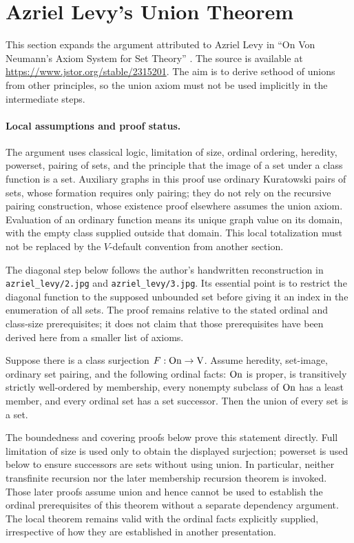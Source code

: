 \def\topic{Mechanization of Azriel Levy's Proof}

\section{Azriel Levy's Union Theorem}
This section expands the argument attributed to Azriel Levy in
``On Von Neumann's Axiom System for Set Theory'' \cite{Levy68}.
The source is available at \url{https://www.jstor.org/stable/2315201}.
The aim is to derive sethood of unions from other principles, so the union
axiom must not be used implicitly in the intermediate steps.

\paragraph{Local assumptions and proof status.}
The argument uses classical logic, limitation of size, ordinal ordering,
heredity, powerset, pairing of sets, and the principle that the image of a
set under a class function is a set. Auxiliary graphs in this proof use
ordinary Kuratowski pairs of sets, whose formation requires only pairing;
they do not rely on the recursive pairing construction, whose existence
proof elsewhere assumes the union axiom. Evaluation of an ordinary function
means its unique graph value on its domain, with the empty class supplied
outside that domain. This local totalization must not be replaced by the
$V$-default convention from another section.

The diagonal step below follows the author's handwritten reconstruction in
\texttt{azriel\_levy/2.jpg} and \texttt{azriel\_levy/3.jpg}. Its essential
point is to restrict the diagonal function to the supposed unbounded set
before giving it an index in the enumeration of all sets. The proof remains
relative to the stated ordinal and class-size prerequisites; it does not
claim that those prerequisites have been derived here from a smaller list
of axioms.

\begin{theorem}
Suppose there is a class surjection $F:\mathrm{On}\to\mathrm{V}$. Assume heredity,
set-image, ordinary set pairing, and the following ordinal facts:
$\mathrm{On}$ is proper, is transitively strictly well-ordered by membership,
every nonempty subclass of $\mathrm{On}$ has a least member, and every ordinal
set has a set successor. Then the union of every set is a set.
\end{theorem}
The boundedness and covering proofs below prove this statement directly.
Full limitation of size is used only to obtain the displayed surjection;
powerset is used below to ensure successors are sets without using union.
In particular, neither transfinite recursion nor the later membership
recursion theorem is invoked. Those later proofs assume union and hence
cannot be used to establish the ordinal prerequisites of this theorem
without a separate dependency argument. The local theorem remains valid
with the ordinal facts explicitly supplied, irrespective of how they are
established in another presentation.


